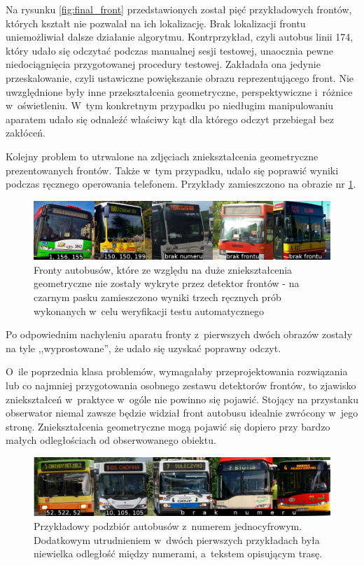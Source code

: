 Na rysunku \ref{fig:final_front} 
przedstawionych został pięć przykładowych frontów, których
kształt nie pozwalał na ich lokalizację. Brak lokalizacji frontu
uniemożliwiał dalsze działanie algorytmu. Kontrprzykład, czyli autobus
linii 174, który udało się odczytać podczas manualnej sesji
testowej, unaocznia pewne niedociągnięcia
przygotowanej procedury testowej. Zakładała ona jedynie 
przeskalowanie, czyli ustawiczne powiększanie 
obrazu reprezentującego front. Nie uwzględnione były inne 
przekształcenia geometryczne, perspektywiczne i~różnice w~oświetleniu.
W~tym konkretnym przypadku po niedługim manipulowaniu aparatem udało się
odnaleźć właściwy kąt dla którego odczyt przebiegał bez zakłóceń.

Kolejny problem to utrwalone na zdjęciach zniekształcenia geometryczne 
prezentowanych frontów.
Także w~tym przypadku,
udało się poprawić wyniki podczas ręcznego operowania telefonem.
Przykłady zamieszczono na obrazie nr \ref{fig:final_deform}.

\begin{figure}[h!]
	\centering
	\includegraphics[width=1\textwidth]{img/final/deform}
	\caption{Fronty autobusów, które ze względu na duże zniekształcenia 
		geometryczne nie zostały wykryte przez detektor frontów -
		na czarnym pasku zamieszczono wyniki trzech ręcznych prób
		wykonanych w~celu weryfikacji testu automatycznego}
	\label{fig:final_deform}
\end{figure}

Po odpowiednim nachyleniu aparatu fronty z~pierwszych dwóch obrazów
zostały na tyle ,,wyprostowane'', że udało się uzyskać poprawny odczyt.

O~ile poprzednia klasa problemów, wymagałaby przeprojektowania 
rozwiązania lub co najmniej przygotowania osobnego zestawu
detektorów frontów, to zjawisko zniekształceń w~praktyce
w~ogóle nie powinno się pojawić.
Stojący na przystanku obserwator niemal zawsze będzie widział
front autobusu idealnie zwrócony w~jego stronę. Zniekształcenia
geometryczne mogą pojawić się dopiero przy bardzo małych odległościach
od obserwowanego obiektu.

\begin{figure}[h!]
	\centering
	\includegraphics[width=1\textwidth]{img/final/jednocy}
	\caption{Przykładowy podzbiór autobusów z~numerem jednocyfrowym.
		Dodatkowym utrudnieniem w~dwóch pierwszych przykładach była
		niewielka odległość między numerami, a~tekstem opisującym trasę.}
	\label{fig:final_jednocy}
\end{figure}

